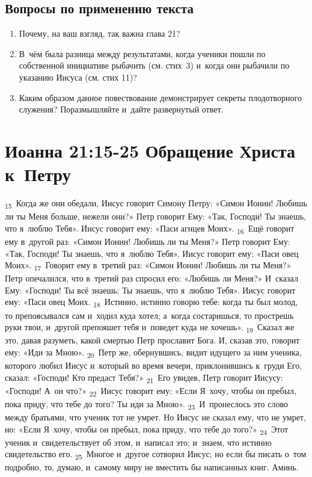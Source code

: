 \documentclass[a4paper,12pt]{article}
\begin{document}
\subsection*{Вопросы по применению текста} 
\begin{enumerate}
    \item Почему, на ваш взгляд, так важна глава 21? 
    
    \myline
    
    \myline
    \item В~чём была разница между результатами, когда ученики пошли по собственной инициативе рыбачить (см. стих~3) и~когда они рыбачили по указанию Иисуса (см. стих 11)? 
    
    \myline
    
    \myline
    \item Каким образом данное повествование демонстрирует секреты плодотворного служения? Поразмышляйте и~дайте развернутый ответ.
    
    \myline
    
    \myline
\end{enumerate}



\section{Иоанна 21:15-25 Обращение Христа к~Петру}


\textsubscript{15}~Когда же они обедали, Иисус говорит Симону Петру: «Симон Ионин! Любишь ли ты Меня больше, нежели они?» Петр говорит Ему: «Так, Господи! Ты знаешь, что я~люблю Тебя». Иисус говорит ему: «Паси агнцев Моих».
\textsubscript{16}~Ещё говорит ему в~другой раз: «Симон Ионин! Любишь ли ты Меня?» Петр говорит Ему: «Так, Господи! Ты знаешь, что я~люблю Тебя». Иисус говорит ему: «Паси овец Моих».
\textsubscript{17}~Говорит ему в~третий раз: «Симон Ионин! Любишь ли ты Меня?» Петр опечалился, что в~третий раз спросил его: «Любишь ли Меня?» И~сказал Ему: «Господи! Ты всё знаешь; Ты знаешь, что я~люблю Тебя». Иисус говорит ему: «Паси овец Моих.
\textsubscript{18}~Истинно, истинно говорю тебе: когда ты был молод, то препоясывался сам и~ходил куда хотел; а~когда состаришься, то прострешь руки твои, и~другой препояшет тебя и~поведет куда не хочешь».
\textsubscript{19}~Сказал же это, давая разуметь, какой смертью Петр прославит Бога. И, сказав это, говорит ему: «Иди за Мною».
\textsubscript{20}~Петр же, обернувшись, видит идущего за ним ученика, которого любил Иисус и~который во время вечери, приклонившись к~груди Его, сказал: «Господи! Кто предаст Тебя?»
\textsubscript{21}~Его увидев, Петр говорит Иисусу: «Господи! А~он что?»
\textsubscript{22}~Иисус говорит ему: «Если Я~хочу, чтобы он пребыл, пока приду, что тебе до того? Ты иди за Мною».
\textsubscript{23}~И~пронеслось это слово между братьями, что ученик тот не умрет. Но Иисус не сказал ему, что не умрет, но: «Если Я~хочу, чтобы он пребыл, пока приду, что тебе до того?»
\textsubscript{24}~Этот ученик и~свидетельствует об этом, и~написал это; и~знаем, что истинно свидетельство его.
\textsubscript{25}~Многое и~другое сотворил Иисус; но если бы писать о~том подробно, то, думаю, и~самому миру не вместить бы написанных книг. Аминь. 
\end{document}
